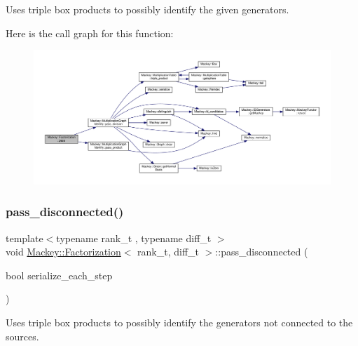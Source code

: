 Uses triple box products to possibly identify the given generators. 

Here is the call graph for this function\+:\nopagebreak
\begin{figure}[H]
\begin{center}
\leavevmode
\includegraphics[width=350pt]{classMackey_1_1Factorization_a9828268663049b5ac2668d4eb0bdd4ff_cgraph}
\end{center}
\end{figure}
\mbox{\label{classMackey_1_1Factorization_aad2d840b523d193f4c3554e9e3f7fb00}} 
\subsubsection{\texorpdfstring{pass\+\_\+disconnected()}{pass\_disconnected()}}
{\footnotesize\ttfamily template$<$typename rank\+\_\+t , typename diff\+\_\+t $>$ \\
void \hyperlink{classMackey_1_1Factorization}{Mackey\+::\+Factorization}$<$ rank\+\_\+t, diff\+\_\+t $>$\+::pass\+\_\+disconnected (\begin{DoxyParamCaption}\item[{bool}]{serialize\+\_\+each\+\_\+step }\end{DoxyParamCaption})}



Uses triple box products to possibly identify the generators not connected to the sources. 

